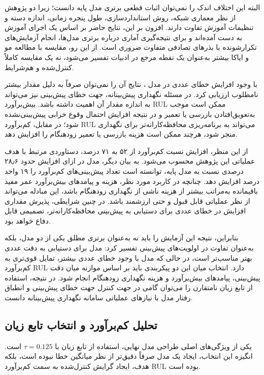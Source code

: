 البته این اختلاف اندک را نمی‌توان
اثبات قطعی برتری مدل پایه دانست؛ زیرا
دو پژوهش از نظر معماری شبکه، روش
استانداردسازی، طول پنجره زمانی،
اندازه دسته و تنظیمات آموزش تفاوت
دارند. افزون بر این، نتایج حاضر
بر اساس یک اجرای آموزش به دست آمده‌اند
و برای نتیجه‌گیری آماری درباره برتری
مدل‌ها، انجام آزمایش‌های تکرارشونده
با بذرهای تصادفی متفاوت ضروری است.
از این رو، مقایسه با مطالعه مو و ایاکا
بیشتر به‌عنوان یک نقطه مرجع در ادبیات
تفسیر می‌شود، نه یک مقایسه کاملاً
کنترل‌شده و هم‌شرایط.

با وجود افزایش خطای عددی در مدل
، نتایج آن را نمی‌توان
صرفاً به دلیل مقدار بیشتر 
نامطلوب ارزیابی کرد. در مسئله نگهداری
پیش‌بینانه، جهت خطای پیش‌بینی نیز
می‌تواند به اندازه مقدار آن اهمیت
داشته باشد. بیش‌برآورد \gls{RUL} ممکن
است موجب به‌تعویق‌افتادن بازرسی یا
تعمیر و در نتیجه افزایش احتمال وقوع
خرابی پیش‌بینی‌نشده شود؛ در مقابل،
کم‌برآورد \gls{RUL} می‌تواند به
برنامه‌ریزی محافظه‌کارانه‌تر برای
نگهداری منجر شود، هرچند ممکن است
هزینه بازرسی یا تعمیر زودهنگام را
افزایش دهد.

از این منظر، افزایش نسبت کم‌برآورد
از ۵۲ به ۷۱ درصد، دستاوردی مرتبط با
هدف عملیاتی این پژوهش محسوب می‌شود.
به بیان دیگر، مدل 
در ازای افزایش حدود ۲۸٫۶ درصدی
 نسبت به مدل پایه، توانسته
است تعداد پیش‌بینی‌های کم‌برآورد را
۱۹ واحد درصد افزایش دهد. چنانچه در
کاربرد مورد نظر، هزینه و پیامدهای
بیش‌برآورد عمر مفید باقیمانده به‌مراتب
بیشتر از هزینه ناشی از نگهداری زودهنگام
باشد، این مبادله می‌تواند از نظر
عملیاتی قابل قبول و حتی ارزشمند باشد.
در چنین شرایطی، پذیرش مقداری افزایش
در خطای عددی برای دستیابی به پیش‌بینی
محافظه‌کارانه‌تر، تصمیمی قابل دفاع
خواهد بود.

بنابراین، نتیجه این آزمایش را باید
نه به‌عنوان برتری مطلق یکی از دو مدل،
بلکه به‌عنوان تفاوت در اولویت‌های
پیش‌بینی تفسیر کرد: مدل 
برای دستیابی به دقت عددی بهتر مناسب‌تر
است، در حالی که مدل 
با وجود خطای عددی بیشتر، تمایل قوی‌تری
به کم‌برآورد \gls{RUL} دارد. انتخاب
میان این دو پیکربندی باید بر اساس
موازنه میان دقت پیش‌بینی، پیامدهای
بیش‌برآورد و هزینه نگهداری زودهنگام
انجام شود. در نتیجه، استفاده از تابع
زیان نامتقارن را می‌توان گامی در جهت
کنترل جهت خطای پیش‌بینی و انطباق
رفتار مدل با نیازهای عملیاتی سامانه
نگهداری پیش‌بینانه دانست.


\subsection{تحلیل کم‌برآورد و انتخاب تابع زیان}

یکی از ویژگی‌های اصلی طراحی مدل نهایی، استفاده از تابع زیان  با $\tau=0.125$ است. انگیزه این انتخاب، ایجاد یک مدل صرفاً دقیق‌تر از نظر میانگین خطا نبوده است، بلکه هدف، ایجاد گرایش کنترل‌شده به سمت کم‌برآورد \gls{RUL} بوده است.



